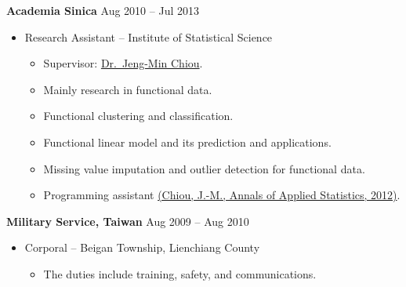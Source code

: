 \documentclass[a4paper,10pt,dvipdfmx]{article}
\begin{document}
\textbf{Academia Sinica} \hfill Aug 2010 -- Jul 2013
\begin{itemize}[noitemsep,nolistsep]
  \item[] Research Assistant -- Institute of Statistical Science
    \begin{itemize}[noitemsep,nolistsep]
      \item[] \hspace{-3ex} Supervisor: \href{http://www.stat.sinica.edu.tw/jmchiou/}{Dr.~Jeng-Min Chiou}.
      \item Mainly research in functional data.
      \item Functional clustering and classification.
      \item Functional linear model and its prediction and applications.
      \item Missing value imputation and outlier detection for functional data.
      \item Programming assistant \href{https://projecteuclid.org/euclid.aoas/1356629052/}{(Chiou, J.-M., Annals of Applied Statistics, 2012)}.\\
    \end{itemize}
\end{itemize}

\textbf{Military Service, Taiwan} \hfill Aug 2009 -- Aug 2010
\begin{itemize}[noitemsep,nolistsep]
  \item[] Corporal -- Beigan Township, Lienchiang County
    \begin{itemize}[noitemsep,nolistsep]
      \item The duties include training, safety, and communications.\\
    \end{itemize}
\end{itemize}
\end{document}
